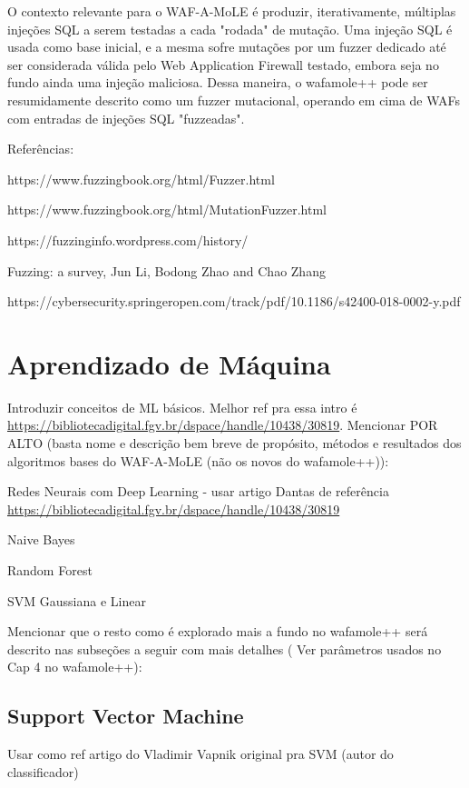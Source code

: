 O contexto relevante para o WAF-A-MoLE é produzir, iterativamente, múltiplas injeções SQL a serem testadas a cada "rodada" de mutação. Uma injeção SQL é usada como base inicial, e a mesma sofre mutações por um fuzzer dedicado até ser considerada válida pelo Web Application Firewall testado, embora seja no fundo ainda uma injeção maliciosa. Dessa maneira, o wafamole++ pode ser resumidamente descrito como um fuzzer mutacional, operando em cima de WAFs com entradas de injeções SQL "fuzzeadas".

Referências:

https://www.fuzzingbook.org/html/Fuzzer.html

https://www.fuzzingbook.org/html/MutationFuzzer.html

https://fuzzinginfo.wordpress.com/history/

Fuzzing: a survey, Jun Li, Bodong Zhao and Chao Zhang

https://cybersecurity.springeropen.com/track/pdf/10.1186/s42400-018-0002-y.pdf

\section{Aprendizado de Máquina}
Introduzir conceitos de ML básicos. Melhor ref pra essa intro é \href{link}{https://bibliotecadigital.fgv.br/dspace/handle/10438/30819}. Mencionar POR ALTO (basta nome e descrição bem breve de propósito, métodos e resultados dos algoritmos bases do WAF-A-MoLE (não os novos do wafamole++)):
\begin{alineas}
\item Redes Neurais com Deep Learning - usar artigo Dantas de referência \href{link}{https://bibliotecadigital.fgv.br/dspace/handle/10438/30819}
\item Naive Bayes
\item Random Forest
\item SVM Gaussiana e Linear
\end{alineas}

Mencionar que o resto como é explorado mais a fundo no wafamole++ será descrito nas subseções a seguir com mais detalhes ( Ver parâmetros usados no Cap 4 no wafamole++): 

\subsection{Support Vector Machine}

Usar como ref artigo do Vladimir Vapnik original pra SVM (autor do classificador)

